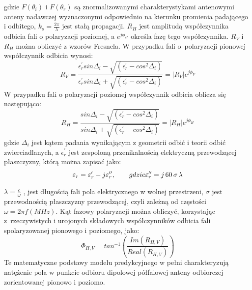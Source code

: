 gdzie $F(\theta_{i} )$  i $F(\theta_{r} )$ są znormalizowanymi charakterystykami antenowymi anteny nadawczej wyznaczonymi odpowiednio na kierunku promienia padającego i odbitego, $k_{o}=\frac{2\pi}{\lambda}$ jest stałą propagacji. $R_{H}$ jest amplitudą współczynnika odbicia fali o polaryzacji poziomej, a $e^{j\phi_{H} }$ określa fazę tego współczynnika. $R_V$ i $R_H$ można obliczyć z wzorów Fresnela.
W przypadku fali o~polaryzacji pionowej współczynnik odbicia wynosi:
\begin{equation} \label{eq:17_17}
    R_{V}=\frac{\epsilon^{'}_r sin\Delta _i-\sqrt{(\epsilon^{'}_r-cos^{2}\Delta _{i})}}{\epsilon^{'}_r sin\Delta _i+\sqrt{(\epsilon^{'}_r-cos^{2}\Delta _{i})}}=|R_{V}|e^{j\phi_V}
\end{equation}
W przypadku fali o polaryzacji poziomej współczynnik odbicia oblicza się następująco:
\begin{equation} \label{eq:17_18}
    R_{H}=\frac{sin\Delta _i-\sqrt{(\epsilon^{'}_r-cos^{2}\Delta _{i})}}{sin\Delta _i+\sqrt{(\epsilon^{'}_r-cos^{2}\Delta _{i})}}=|R_{H}|e^{j\phi_H}
\end{equation}
gdzie $ \Delta _{i} $  jest kątem padania wynikającym z geometrii odbić i teorii odbić zwierciadlanych, a $\epsilon_{r}^{'}$ jest zespoloną przenikalnością elektryczną przewodzącej płaszczyzny, którą można zapisać jako:
\begin{equation} \label{eq:17_19}
    \varepsilon_r = \varepsilon_r' - j \varepsilon_r'', \qquad gdzie \space
 \varepsilon_r'' = j\,60\,\sigma\,\lambda
\end{equation}


$\lambda =\frac{c}{\omega}$ , jest długością fali pola elektrycznego w wolnej przestrzeni, $\sigma$  jest przewodnością płaszczyzny przewodzącej, czyli zależną od częstości $\omega =2\pi f(MHz)$.
Kąt fazowy polaryzacji można obliczyć, korzystając z~rzeczywistych i urojonych składowych współczynników odbicia fali spolaryzowanej pionowego i poziomego, jako:
\begin{equation} \label{eq:17_20}
    \Phi_{H,V}=tan^{-1}(\frac{Im(R_{H,V})}{Real(R_{H,V})})
\end{equation}
Te matematyczne podstawy modelu predykcyjnego w pełni charakteryzują natężenie pola w punkcie odbioru dipolowej półfalowej anteny odbiorczej zorientowanej pionowo i poziomo.



